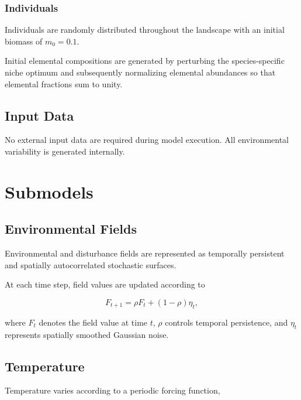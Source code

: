 \subsubsection{Individuals}

Individuals are randomly distributed throughout the landscape with an initial biomass of $m_0=0.1$.

Initial elemental compositions are generated by perturbing the species-specific niche optimum and subsequently normalizing elemental abundances so that elemental fractions sum to unity.

\subsection{Input Data}

No external input data are required during model execution. All environmental variability is generated internally.


\section{Submodels}


\subsection{Environmental Fields}

Environmental and disturbance fields are represented as temporally persistent and spatially autocorrelated stochastic surfaces.

At each time step, field values are updated according to

\begin{equation}
F_{t+1}=\rho F_t+(1-\rho)\eta_t,
\end{equation}

where $F_t$ denotes the field value at time $t$, $\rho$ controls temporal persistence, and $\eta_t$ represents spatially smoothed Gaussian noise.

\subsection{Temperature}

Temperature varies according to a periodic forcing function,

